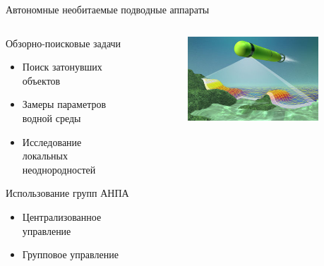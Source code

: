 \documentclass{beamer}
\begin{document}
\begin{frame}{Автономные необитаемые подводные аппараты}

 \begin{columns}[onlytextwidth, t]
    \begin{column}{0.5\textwidth}
        Обзорно-поисковые задачи
        \begin{itemize}
        \item Поиск затонувших объектов
        \item Замеры параметров водной среды
        \item Исследование локальных неоднородностей \linebreak
        \end{itemize}

        Использование групп АНПА
        \begin{itemize}
        \item Централизованное управление
        \item Групповое управление
        \end{itemize}
    \end{column}

    \begin{column}{0.1\textwidth}
    \end{column}

    \begin{column}{0.4\textwidth}

        \begin{figure}[here]
            \includegraphics[scale=0.4]{images/AUV5.JPG}
        \end{figure}

    \end{column}

​\end{columns}



\end{frame}
\end{document}
